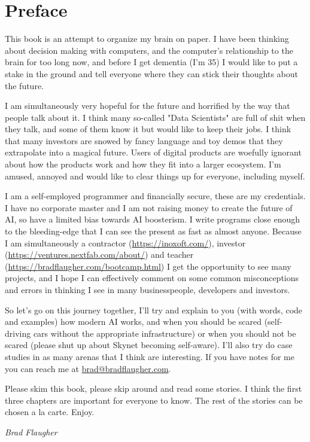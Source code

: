 \chapter*{Preface}

This book is an attempt to organize my brain on paper. I have been thinking about decision making with computers, and the computer's relationship to the brain for too long now, and before I get dementia (I'm 35) I would like to put a stake in the ground and tell everyone where they can stick their thoughts about the future. 

I am simultaneously very hopeful for the future and horrified by the way that people talk about it. I think many so-called "Data Scientists" are full of shit when they talk, and some of them know it but would like to keep their jobs. I think that many investors are snowed by fancy language and toy demos that they extrapolate into a magical future. Users of digital products are woefully ignorant about how the products work and how they fit into a larger ecosystem. I'm amused, annoyed and would like to clear things up for everyone, including myself.

I am a self-employed programmer and financially secure, these are my credentials. I have no corporate master and I am not raising money to create the future of AI, so have a limited bias towards AI boosterism. I write programs close enough to the bleeding-edge that I can see the present as fast as almost anyone. Because I am simultaneously a contractor (\url{https://inoxoft.com/}), investor (\url{https://ventures.nextfab.com/about/}) and teacher (\url{https://bradflaugher.com/bootcamp.html}) I get the opportunity to see many projects, and I hope I can effectively comment on some common misconceptions and errors in thinking I see in many businesspeople, developers and investors.

So let's go on this journey together, I'll try and explain to you (with words, code and examples) how modern AI works, and when you should be scared (self-driving cars without the appropriate infrastructure) or when you should not be scared (please shut up about Skynet becoming self-aware). I'll also try do case studies in as many arenas that I think are interesting. If you have notes for me you can reach me at \href{mailto:brad@bradflaugher.com}{brad@bradflaugher.com}.

Please skim this book, please skip around and read some stories. I think the first three chapters are important for everyone to know. The rest of the stories can be chosen a la carte. Enjoy.

\begin{flushright}
	\textit{Brad Flaugher}
\end{flushright}
